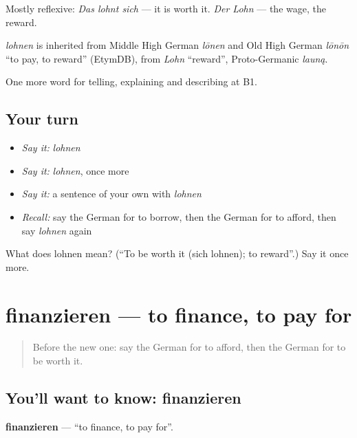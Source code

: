 Mostly reflexive: \emph{Das lohnt sich} — it is worth it. \emph{Der Lohn} — the wage, the reward.

\begin{cousinweb}
\emph{lohnen} is inherited from Middle High German \emph{lōnen} and Old High German \emph{lōnōn} \textquotedblleft{}to pay, to reward\textquotedblright{} (EtymDB), from \emph{Lohn} \textquotedblleft{}reward\textquotedblright{}, Proto-Germanic \emph{launą}.
\end{cousinweb}

\begin{grammarlens}[title={What you've built}]
One more word for telling, explaining and describing at B1.
\end{grammarlens}

\subsection*{Your turn}
\begin{itemize}
\raggedright
  \item \emph{Say it:} \emph{lohnen}
  \item \emph{Say it:} \emph{lohnen}, once more
  \item \emph{Say it:} a sentence of your own with \emph{lohnen}
  \item \emph{Recall:} say the German for to borrow, then the German for to afford, then say \emph{lohnen} again
\end{itemize}

\begin{tcolorbox}[breakable,colback=teal!4,colframe=teal!35!black,title={Before you move on}]
What does lohnen mean? (\textquotedblleft{}To be worth it (sich lohnen); to reward\textquotedblright{}.) Say it once more.
\end{tcolorbox}
\section[finanzieren]{finanzieren — to finance, to pay for}

\label{lesson:GE-C389-finanzieren}



\begin{quote}
Before the new one: say the German for to afford, then the German for to be worth it.
\end{quote}

\subsection*{You'll want to know: finanzieren}
\textbf{finanzieren} — \textquotedblleft{}to finance, to pay for\textquotedblright{}.

